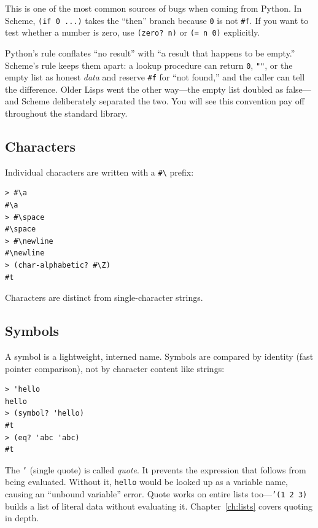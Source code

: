 \begin{warning}
This is one of the most common sources of bugs when coming from Python. In Scheme, \texttt{(if 0 ...)} takes the ``then'' branch because \texttt{0} is not \texttt{\#f}. If you want to test whether a number is zero, use \texttt{(zero? n)} or \texttt{(= n 0)} explicitly.
\end{warning}

\begin{note}
Python's rule conflates ``no result'' with ``a result that happens to be empty.'' Scheme's rule keeps them apart: a lookup procedure can return \texttt{0}, \texttt{""}, or the empty list as honest \emph{data} and reserve \texttt{\#f} for ``not found,'' and the caller can tell the difference. Older Lisps went the other way---the empty list doubled as false---and Scheme deliberately separated the two. You will see this convention pay off throughout the standard library.
\end{note}

\subsection{Characters}

Individual characters are written with a \texttt{\#\textbackslash} prefix:

\begin{lstlisting}[style=repl]
> #\a
#\a
> #\space
#\space
> #\newline
#\newline
> (char-alphabetic? #\Z)
#t
\end{lstlisting}

Characters are distinct from single-character strings.

\subsection{Symbols}

A symbol is a lightweight, interned name. Symbols are compared by identity (fast pointer comparison), not by character content like strings:

\begin{lstlisting}[style=repl]
> 'hello
hello
> (symbol? 'hello)
#t
> (eq? 'abc 'abc)
#t
\end{lstlisting}

The \texttt{'} (single quote) is called \emph{quote}. It prevents the expression that follows from being evaluated. Without it, \texttt{hello} would be looked up as a variable name, causing an ``unbound variable'' error. Quote works on entire lists too---\texttt{'(1 2 3)} builds a list of literal data without evaluating it. Chapter~\ref{ch:lists} covers quoting in depth.

